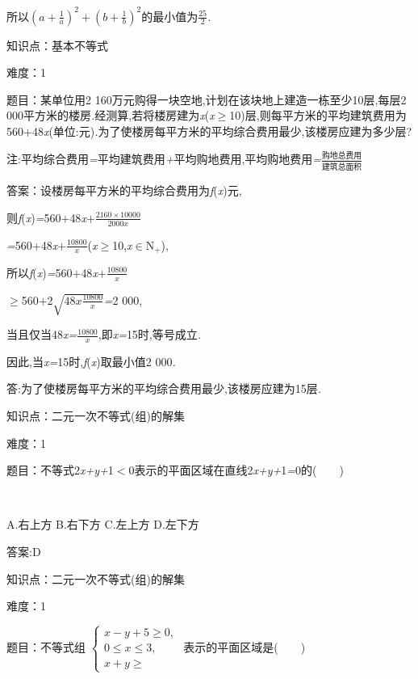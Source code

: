 \documentclass{article} %
\begin{document}
所以${(a+\frac{1}{a})}^2+{(b+\frac{1}{b})}^2$的最小值为$\frac{25}{2}$\textit{.}

知识点：基本不等式

难度：1

 题目：某单位用2 160万元购得一块空地,计划在该块地上建造一栋至少10层,每层2 000平方米的楼房\textit{.}经测算,若将楼房建为\textit{x}(\textit{x}$\mathrm{\ge}$10)层,则每平方米的平均建筑费用为560\textit{$+$}48\textit{x}(单位:元)\textit{.}为了使楼房每平方米的平均综合费用最少,该楼房应建为多少层?

 注:平均综合费用\textit{=}平均建筑费用\textit{+}平均购地费用,平均购地费用\textit{=}$\frac{购地总费用}{建筑总面积}$

 答案：设楼房每平方米的平均综合费用为\textit{f}(\textit{x})元,

则\textit{f}(\textit{x})\textit{=}560\textit{$+$}48\textit{x$+$}$\frac{2160\times 10000}{2000x}$

\textit{=}560\textit{$+$}48\textit{x$+\frac{10800}{x}$}(\textit{x}$\mathrm{\ge}$10,\textit{x}$\mathrm{\in}$N\textit{${}_{+}$}),

所以\textit{f}(\textit{x})\textit{=}560\textit{$+$}48\textit{x$+$}$\frac{10800}{x}$

$\mathrm{\ge}$560\textit{$+$}2$\sqrt{48x\frac{10800}{x}}$\textit{=}2 000,

当且仅当48\textit{x=}$\frac{10800}{x}$,即\textit{x=}15时,等号成立\textit{.}

因此,当\textit{x=}15时,\textit{f}(\textit{x})取最小值2 000\textit{.}

答:为了使楼房每平方米的平均综合费用最少,该楼房应建为15层\textit{.}

知识点：二元一次不等式(组)的解集

难度：1

 题目：不等式2\textit{x+y+}1\textit{$<$}0表示的平面区域在直线2\textit{x+y+}1\textit{=}0的(\textit{　　})

 \textit{　　　　　　} \textit{　　　　　　} \textit{　　　　　}

 A.右上方 B.右下方 C.左上方 D.左下方

 答案:D

知识点：二元一次不等式(组)的解集

难度：1

 题目：不等式组
$
\begin{cases}
x-y+5 \ge 0,\\
0 \le x \le 3,\\
x+y \ge
\end{cases}$
表示的平面区域是(\textit{　　})
\end{document}
